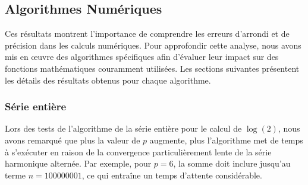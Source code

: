 \documentclass{article}
\begin{document}
\subsection{Algorithmes Numériques}
Ces résultats montrent l'importance de comprendre les erreurs d'arrondi et de précision dans les calculs numériques. Pour approfondir cette analyse, nous avons mis en œuvre des algorithmes spécifiques afin d'évaluer leur impact sur des fonctions mathématiques couramment utilisées. Les sections suivantes présentent les détails des résultats obtenus pour chaque algorithme.

\subsubsection{Série entière}
Lors des tests de l'algorithme de la série entière pour le calcul de \( \log(2) \), nous avons remarqué que plus la valeur de \( p \) augmente, plus l'algorithme met de temps à s'exécuter en raison de la convergence particulièrement lente de la série harmonique alternée. Par exemple, pour \( p = 6 \), la somme doit inclure jusqu’au terme \( n = 100000001 \), ce qui entraîne un temps d’attente considérable. 
\end{document}
